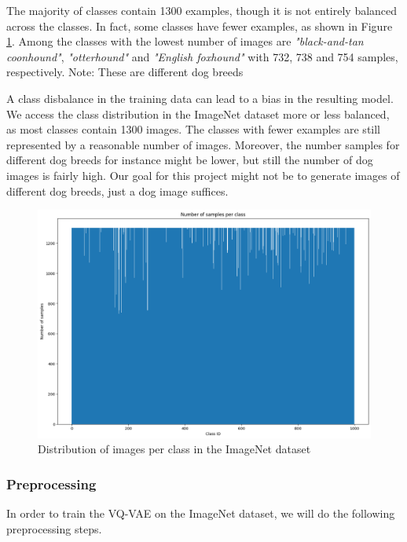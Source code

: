 \documentclass[10pt,a4paper,twoside]{article}
\begin{document}
    The majority of classes contain 1300 examples, though it is not entirely balanced across the classes. In fact, some classes have fewer examples, as shown in Figure \ref{fig:imnet_dist}. Among the classes with the lowest number of images are \textit{"black-and-tan coonhound"}, \textit{"otterhound"} and \textit{"English foxhound"} with 732, 738 and 754 samples, respectively. Note: These are different dog breeds

    A class disbalance in the training data can lead to a bias in the resulting model. We access the class distribution in the ImageNet dataset more or less balanced, as most classes contain 1300 images. The classes with fewer examples are still represented by a reasonable number of images. Moreover, the number samples for different dog breeds for instance might be lower, but still the number of dog images is fairly high. Our goal for this project might not be to generate images of different dog breeds, just a dog image suffices.

    \begin{figure}
        \centering
        \includegraphics[width=\textwidth]{../../sample_images/imagenet_dist.png}
        \caption{Distribution of images per class in the ImageNet dataset}
        \label{fig:imnet_dist}
    \end{figure}

    \subsubsection{Preprocessing}
    In order to train the VQ-VAE on the ImageNet dataset, we will do the following preprocessing steps.
\end{document}
